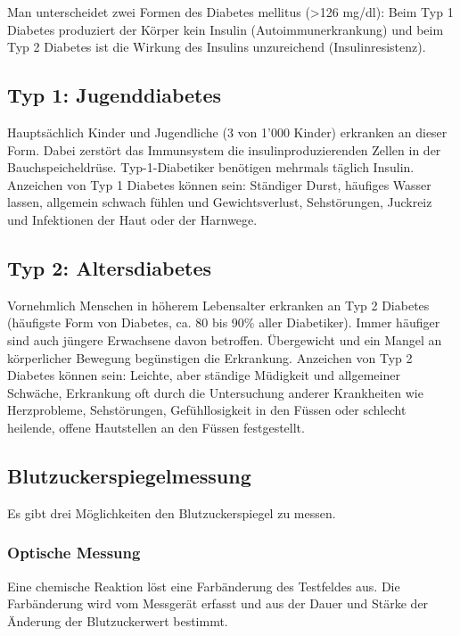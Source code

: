 Man unterscheidet zwei Formen des Diabetes mellitus (>126 mg/dl): Beim Typ 1 Diabetes produziert der Körper kein Insulin (Autoimmunerkrankung) und beim Typ 2 Diabetes ist die Wirkung des Insulins unzureichend (Insulinresistenz).

\subsection{Typ 1: Jugenddiabetes}

Hauptsächlich Kinder und Jugendliche (3 von 1'000 Kinder) erkranken an dieser Form. Dabei zerstört das Immunsystem die insulinproduzierenden Zellen in der Bauchspeicheldrüse. Typ-1-Diabetiker benötigen mehrmals täglich Insulin. Anzeichen von Typ 1 Diabetes können sein: Ständiger Durst, häufiges Wasser lassen, allgemein schwach fühlen und Gewichtsverlust, Sehstörungen, Juckreiz und Infektionen der Haut oder der Harnwege.

\subsection{Typ 2: Altersdiabetes}

Vornehmlich Menschen in höherem Lebensalter erkranken an Typ 2 Diabetes (häufigste Form von Diabetes, ca. 80 bis 90\% aller Diabetiker). Immer häufiger sind auch jüngere Erwachsene davon betroffen. Übergewicht und ein Mangel an körperlicher Bewegung begünstigen die Erkrankung. Anzeichen von Typ 2 Diabetes können sein: Leichte, aber ständige Müdigkeit und allgemeiner Schwäche, Erkrankung oft durch die Untersuchung anderer Krankheiten wie Herzprobleme, Sehstörungen, Gefühllosigkeit in den Füssen oder schlecht heilende, offene Hautstellen an den Füssen festgestellt.

\subsection{Blutzuckerspiegelmessung}

Es gibt drei Möglichkeiten den Blutzuckerspiegel zu messen.

\subsubsection{Optische Messung}

Eine chemische Reaktion löst eine Farbänderung des Testfeldes aus. Die Farbänderung wird vom Messgerät erfasst und aus der Dauer und Stärke der Änderung der Blutzuckerwert bestimmt.

